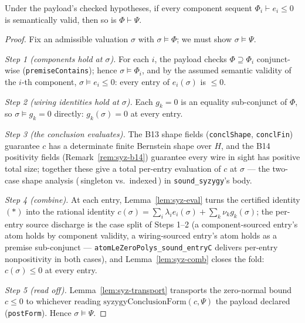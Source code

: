 \begin{bthm}[soundness of \rulename{Syzygy} = Lemma B, dialect D]
\label{thm:syz-sound}
Under the payload's checked hypotheses, if every component sequent
$\Phi_i \vdash e_i \leq 0$ is semantically valid, then so is
$\Phi \vdash \Psi$.
\end{bthm}
\begin{proof}
Fix an admissible valuation $\sigma$ with $\sigma \models \Phi$; we must
show $\sigma \models \Psi$.

\emph{Step 1 (components hold at $\sigma$).} For each $i$, the payload
checks $\Phi \supseteq \Phi_i$ conjunct-wise (\texttt{premiseContains});
hence $\sigma \models \Phi_i$, and by the assumed semantic validity of the
$i$-th component, $\sigma \models e_i \leq 0$: every entry of
$e_i(\sigma)$ is $\leq 0$.

\emph{Step 2 (wiring identities hold at $\sigma$).} Each $g_k = 0$ is an
equality sub-conjunct of $\Phi$, so $\sigma \models g_k = 0$ directly:
$g_k(\sigma) = 0$ at every entry.

\emph{Step 3 (the conclusion evaluates).} The B13 shape fields
(\texttt{conclShape}, \texttt{conclFin}) guarantee $c$ has a determinate
finite Bernstein shape over $H$, and the B14 positivity fields
(Remark~\ref{rem:syz-b14}) guarantee every wire in sight has positive total
size; together these give a total per-entry evaluation of $c$ at $\sigma$
--- the two-case shape analysis (\,singleton vs.\ indexed\,) in
\texttt{sound\_syzygy}'s body.

\emph{Step 4 (combine).} At each entry, Lemma~\ref{lem:syz-eval} turns the
certified identity $(\ast)$ into the rational identity
$c(\sigma) = \sum_i \lambda_i e_i(\sigma) + \sum_k \nu_k g_k(\sigma)$; the
per-entry source discharge is the case split of Steps 1--2 (a
component-sourced entry's atom holds by component validity, a
wiring-sourced entry's atom holds as a premise sub-conjunct ---
\texttt{atomLeZeroPolys\_sound\_entryC} delivers per-entry nonpositivity in
both cases), and Lemma~\ref{lem:syz-comb} closes the fold:
$c(\sigma) \leq 0$ at every entry.

\emph{Step 5 (read off).} Lemma~\ref{lem:syz-transport} transports the
zero-normal bound $c \leq 0$ to whichever reading
$\mathrm{syzygyConclusionForm}(c, \Psi)$ the payload declared
(\texttt{postForm}). Hence $\sigma \models \Psi$.
\end{proof}

